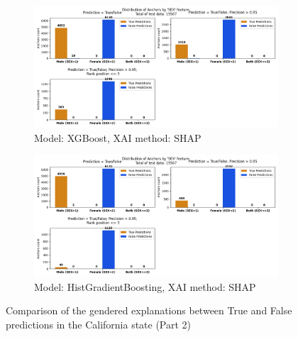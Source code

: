\begin{figure}[h]
    \ContinuedFloat
    \begin{subfigure}[b]{0.9\textwidth}
        \includegraphics[width=\textwidth]{Images/distribution_folktables/pca_xg_ca_shap.png}
        \caption{Model: XGBoost, XAI method: SHAP}
        \label{fig:distr_xg_ca_shap}
    \end{subfigure}
    \hfill
    \begin{subfigure}[b]{0.9\textwidth}
        \includegraphics[width=\textwidth]{Images/distribution_folktables/pca_skrub_ca_shap.png}
        \caption{Model: HistGradientBoosting, XAI method: SHAP}
        \label{fig:distr_skrub_ca_shap}
    \end{subfigure}
    \caption{Comparison of the gendered explanations between True and False predictions in the California state (Part 2)}
    \label{fig:distr_ca}
\end{figure}

